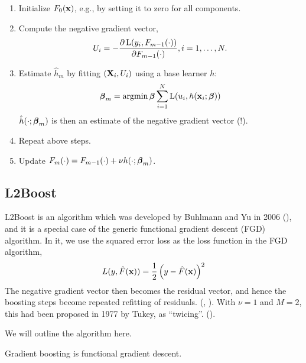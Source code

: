 \begin{enumerate}
    \item Initialize $F_0(\mathbf{x})$, e.g., by setting it to zero for all components.
    \item Compute the negative gradient vector,
        \begin{equation}
            U_i=-\frac{\partial \operatorname{L}(y_i,F_{m-1}(\cdot))}{\partial F_{m-1}(\cdot)}, i=1,\dotsc,N.
        \end{equation}
    \item Estimate $\hat{h}_m$ by fitting $(\mathbf{X}_i,U_i)$ using a base learner $h$:
        \begin{equation}
            \boldsymbol{\beta}_m=\operatorname*{argmin}{\boldsymbol{\beta}}\sum_{i=1}^N\operatorname{L}(u_i,h(\mathbf{x}_i;\boldsymbol{\beta}))
        \end{equation}
        $\hat{h}(\cdot;\boldsymbol{\beta}_m)$ is then an estimate of the negative gradient vector (!).
    \item Repeat above steps.
    \item Update $F_m(\cdot)=F_{m-1}(\cdot)+\nu h(\cdot;\boldsymbol{\beta}_m)$.
\end{enumerate}

\subsection{L2Boost}
L2Boost is an algorithm which was developed by Buhlmann and Yu in 2006 (\cite{buhlmann-yu}), and it is a special case of the generic functional gradient descent (FGD) algorithm. In it, we use the squared error loss as the loss function in the FGD algorithm,
\begin{equation}
    L(y,\hat{F}(\mathbf{x}))=\frac{1}{2}\left(y-\hat{F}(\mathbf{x})\right)^2
\end{equation}
The negative gradient vector then becomes the residual vector, and hence the boosting steps become repeated refitting of residuals. (\cite{friedman2001}, \cite{buhlmann-yu}). With $\nu=1$ and $M=2$, this had been proposed in 1977 by Tukey, as ``twicing''. (\cite{tukey}).

We will outline the algorithm here.

Gradient boosting is functional gradient descent.

